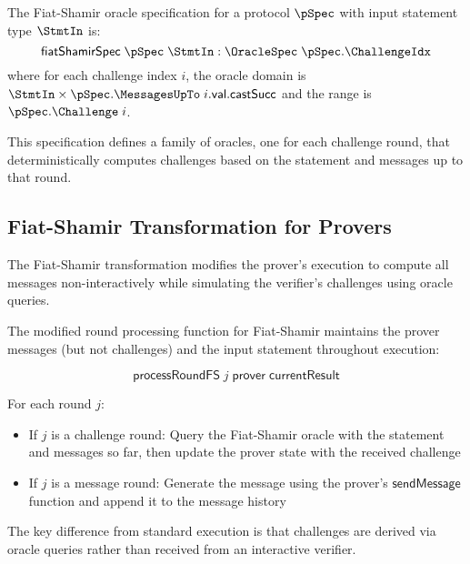 \begin{definition}
    \label{def:fiat_shamir_spec}
    The Fiat-Shamir oracle specification for a protocol $\pSpec$ with input statement type $\StmtIn$ is:
    \[ \mathsf{fiatShamirSpec} \;\pSpec \;\StmtIn : \OracleSpec \;\pSpec.\ChallengeIdx \]
    where for each challenge index $i$, the oracle domain is $\StmtIn \times \pSpec.\MessagesUpTo \;i.\mathsf{val}.\mathsf{castSucc}$ and the range is $\pSpec.\Challenge \;i$.

    This specification defines a family of oracles, one for each challenge round, that deterministically computes challenges based on the statement and messages up to that round.
\end{definition}

\subsection{Fiat-Shamir Transformation for Provers}\label{sec:fiat_shamir_prover}

The Fiat-Shamir transformation modifies the prover's execution to compute all messages non-interactively while simulating the verifier's challenges using oracle queries.

\begin{definition}
    \label{def:prover_process_round_fs}
    The modified round processing function for Fiat-Shamir maintains the prover messages (but not challenges) and the input statement throughout execution:

    \[ \mathsf{processRoundFS} \;j \;\mathsf{prover} \;\mathsf{currentResult} \]

    For each round $j$:
    \begin{itemize}
        \item If $j$ is a challenge round: Query the Fiat-Shamir oracle with the statement and messages so far, then update the prover state with the received challenge
        \item If $j$ is a message round: Generate the message using the prover's $\mathsf{sendMessage}$ function and append it to the message history
    \end{itemize}

    The key difference from standard execution is that challenges are derived via oracle queries rather than received from an interactive verifier.
\end{definition}

